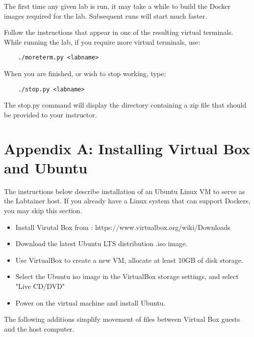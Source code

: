 \documentclass{article}
\begin{document}
The first time any given lab is run, it may take a while to build the Docker images 
required for the lab.  Subsequent runs will start much faster.

Follow the instructions that appear in one of the resulting virtual terminals.
While running the lab, if you require more virtual terminals, use:
\begin{verbatim}
    ./moreterm.py <labname>
\end{verbatim}

When you are finished, or wish to stop working, type:
\begin{verbatim}
    ./stop.py <labname>
\end{verbatim}
The stop.py command will display the directory containing a zip file that should be provided to your instructor.

\newpage
\appendix 
\section {Appendix A: Installing Virtual Box and Ubuntu}
\label{sec:appendixA}
The instructions below describe installation of an Ubuntu Linux VM 
to serve as the Labtainer host.  If you already have a Linux system
that can support Dockers, you may skip this section.
\begin{itemize}
\item Install Virutal Box from : https://www.virtualbox.org/wiki/Downloads
\item Download the latest Ubuntu LTS distribution .iso image.
\item Use VirtualBox to create a new VM, allocate at least 10GB of disk storage.
\item Select the Ubuntu iso image in the VirtualBox storage settings, and select "Live CD/DVD"
\item Power on the virtual machine and install Ubuntu.
\end{itemize}

The following additions simplify movement of files between Virtual Box guests
and the host computer.
\end{document}
